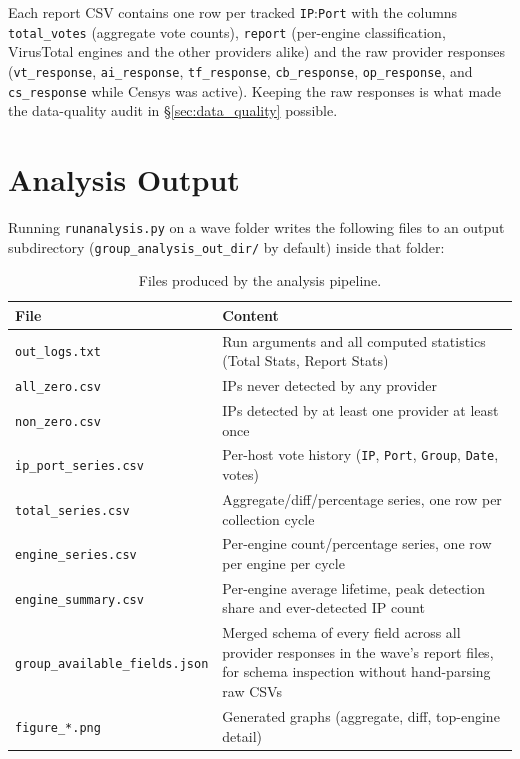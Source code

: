 Each report CSV contains one row per tracked \texttt{IP}:\texttt{Port} with the columns
\texttt{total\_votes} (aggregate vote counts), \texttt{report} (per-engine classification, VirusTotal
engines and the other providers alike) and the raw provider responses (\texttt{vt\_response},
\texttt{ai\_response}, \texttt{tf\_response}, \texttt{cb\_response}, \texttt{op\_response}, and
\texttt{cs\_response} while Censys was active). Keeping the raw responses is what made the
data-quality audit in \S\ref{sec:data_quality} possible.

\section{Analysis Output}

Running \texttt{runanalysis.py} on a wave folder writes the following files to an output
subdirectory (\texttt{group\_analysis\_out\_dir/} by default) inside that folder:

\begin{table}[h]
  \centering
  \caption{Files produced by the analysis pipeline.}
  \label{tab:analysis_output}
  \begin{tabularx}{\linewidth}{lX}
    \toprule
    \textbf{File} & \textbf{Content} \\
    \midrule
    \texttt{out\_logs.txt}       & Run arguments and all computed statistics (Total Stats, Report Stats) \\
    \texttt{all\_zero.csv}       & IPs never detected by any provider \\
    \texttt{non\_zero.csv}       & IPs detected by at least one provider at least once \\
    \texttt{ip\_port\_series.csv}  & Per-host vote history (\texttt{IP}, \texttt{Port}, \texttt{Group}, \texttt{Date}, votes) \\
    \texttt{total\_series.csv}   & Aggregate/diff/percentage series, one row per collection cycle \\
    \texttt{engine\_series.csv}  & Per-engine count/percentage series, one row per engine per cycle \\
    \texttt{engine\_summary.csv} & Per-engine average lifetime, peak detection share and
      ever-detected IP count \\
    \texttt{group\_available\_fields.json} & Merged schema of every field across all provider
      responses in the wave's report files, for schema inspection without hand-parsing raw CSVs \\
    \texttt{figure\_*.png}       & Generated graphs (aggregate, diff, top-engine detail) \\
    \bottomrule
  \end{tabularx}
\end{table}

